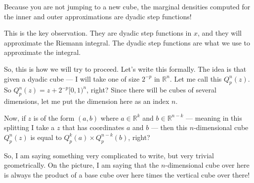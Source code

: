 \begin{math-stroke}
\begin{center}
\end{center}
\end{math-stroke}

\begin{spoken-clean}[00:11:00 - 00:15:15]
Because you are not jumping to a new cube, the marginal densities computed for the inner and outer approximations are dyadic step functions! 

This is the key observation. They are dyadic step functions in $x$, and they will approximate the Riemann integral. The dyadic step functions are what we use to approximate the integral. 

So, this is how we will try to proceed. Let's write this formally. The idea is that given a dyadic cube — I will take one of size $2^{-p}$ in $\mathbb{R}^n$. Let me call this $Q_p^n(z)$. So $Q_p^n(z) = z + 2^{-p}[0,1)^n$, right? Since there will be cubes of several dimensions, let me put the dimension here as an index $n$. 

Now, if $z$ is of the form $(a,b)$ where $a \in \mathbb{R}^k$ and $b \in \mathbb{R}^{n-k}$ — meaning in this splitting I take a $z$ that has coordinates $a$ and $b$ — then this $n$-dimensional cube $Q_p^n(z)$ is equal to $Q_p^k(a) \times Q_p^{n-k}(b)$, right? 

So, I am saying something very complicated to write, but very trivial geometrically. On the picture, I am saying that the $n$-dimensional cube over here is always the product of a base cube over here times the vertical cube over there!
\end{spoken-clean}

